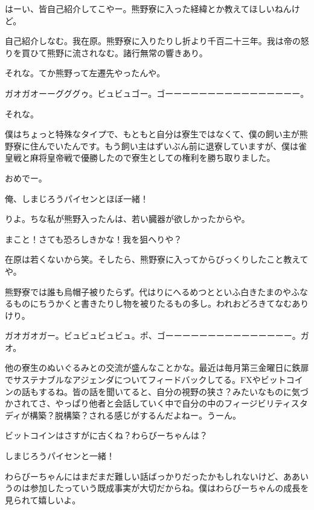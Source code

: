 \begin{multicols}{2}

はーい、皆自己紹介してこやー。熊野寮に入った経緯とか教えてほしいねんけど。

自己紹介しなむ。我在原。熊野寮に入りたりし折より千百二十三年。我は帝の怒りを買ひて熊野に流されなむ。諸行無常の響きあり。

それな。てか熊野って左遷先やったんや。

ガオガオーーグググゥ。ビュビュゴー。ゴーーーーーーーーーーーーーーーー。

それな。

僕はちょっと特殊なタイプで、もともと自分は寮生ではなくて、僕の飼い主が熊野寮に住んでいたんです。もう飼い主はずいぶん前に退寮していますが、僕は雀皇戦と麻将皇帝戦で優勝したので寮生としての権利を勝ち取りました。

おめでー。

俺、しまじろうパイセンとほぼ一緒！

りよ。ちな私が熊野入ったんは、若い臓器が欲しかったからや。

まこと！さても恐ろしきかな！我を狙へりや？

在原は若くないから笑。そしたら、熊野寮に入ってからびっくりしたこと教えてや。

熊野寮では誰も烏帽子被りたらず。代はりにへるめつとといふ白きたまのやふなるものにちうかくと書きたりし物を被りたるもの多し。われおどろきてなむありけり。

ガオガオガー。ビュビュビュビュ。ポ、ゴーーーーーーーーーーーーーーー。ガオ。

他の寮生のぬいぐるみとの交流が盛んなことかな。最近は毎月第三金曜日に鉄扉でサステナブルなアジェンダについてフィードバックしてる。FXやビットコインの話もするね。皆の話を聞いてると、自分の視野の狭さ？みたいなものに気づかされてさ、やっぱり他者と会話していく中で自分の中のフィージビリティスタディが構築？脱構築？される感じがするんだよねー。うーん。

ビットコインはさすがに古くね？わらびーちゃんは？

しまじろうパイセンと一緒！

わらびーちゃんにはまだまだ難しい話ばっかりだったかもしれないけど、ああいうのは参加したっていう既成事実が大切だからね。僕はわらびーちゃんの成長を見られて嬉しいよ。


\end{multicols}
